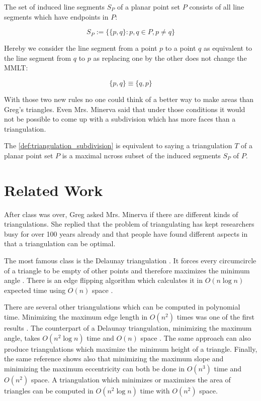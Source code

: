 \begin{definition}\label{def:induced_segments}
  The set of induced line segments \(S_P\) of a planar point set \(P\)
  consists of all line segments which have endpoints in \(P\):

  \[ S_P := \{\{p,q\} : p,q\in P, p\neq q\} \]

  Hereby we consider the line segment from a point \(p\) to a point
  \(q\) as equivalent to the line segment from \(q\) to \(p\) as 
  replacing one by the other does not change the \gls{MMLT}:

  \[ \{p, q\} \equiv \{q, p\} \]
\end{definition}

With those two new rules no one could think of a better way to make
areas than Greg's triangles. Even Mrs. Minerva said that under those
conditions it would not be possible to come up with a subdivision
which has more faces than a triangulation.

\begin{definition}[Triangulation]\label{def:triangulation}
  The \cref{def:triangulation_subdivision} is equivalent to saying
  a triangulation \(T\) of a planar point set \(P\) is a maximal
  \gls{ncross} subset of the induced segments \(S_P\) of \(P\).
\end{definition}

\section{Related Work}
After class was over, Greg asked Mrs. Minerva if there are different
kinds of triangulations. She replied that the problem of 
triangulating has kept researchers busy for over 100 years already
\cite{triangulation_hilbert} and that people have found different
aspects in that a triangulation can be optimal.

The most famous class is the Delaunay triangulation
\cite[Section 9.2]{deberg_compgeom}. It forces every circumcircle
of a triangle to be empty of other points and therefore maximizes
the minimum angle \cite[Theorem 9.9]{deberg_compgeom}. There is an
edge flipping algorithm which calculates it in \(O(n \log n)\) 
expected time using \(O(n)\) space 
\cite[Theorem 9.12]{deberg_compgeom}.

There are several other triangulations which can be computed in
polynomial time. Minimizing the maximum edge length in \(O(n^2)\)
times was one of the first results \cite{triangulation_minmax_length}.
The counterpart of a Delaunay triangulation, 
minimizing the maximum angle, takes \(O(n^2 \log n)\) time and
\(O(n)\) space \cite{triangulation_edge_insertion}. The same
approach can also produce triangulations which maximize the minimum 
height of a triangle. Finally, the same reference shows also that 
minimizing the maximum slope and minimizing the maximum eccentricity 
can both be done in \(O(n^3)\) time and \(O(n^2)\) space. A 
triangulation which minimizes or maximizes the area of triangles can
be computed in \(O(n^2 \log n)\) time with \(O(n^2)\) space.
\cite{triangulation_area}


